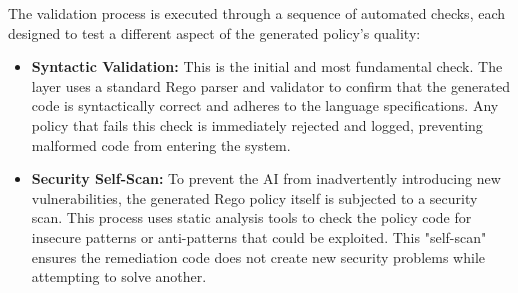 The validation process is executed through a sequence of automated checks, each designed to test a different aspect of the generated policy's quality:

\begin{itemize}
    \item \textbf{Syntactic Validation:} This is the initial and most fundamental check. The layer uses a standard Rego parser and validator to confirm that the generated code is syntactically correct and adheres to the language specifications. Any policy that fails this check is immediately rejected and logged, preventing malformed code from entering the system.
    \item \textbf{Security Self-Scan:} To prevent the AI from inadvertently introducing new vulnerabilities, the generated Rego policy itself is subjected to a security scan. This process uses static analysis tools to check the policy code for insecure patterns or anti-patterns that could be exploited. This "self-scan" ensures the remediation code does not create new security problems while attempting to solve another.

\end{itemize}

